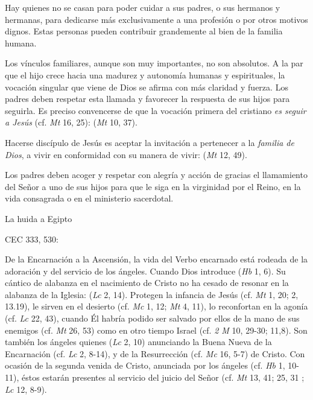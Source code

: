 	 Hay quienes no se casan para poder cuidar a sus padres, o sus hermanos y hermanas, para dedicarse más exclusivamente a una profesión o por otros motivos dignos. Estas personas pueden contribuir grandemente al bien de la familia humana.
	
	 Los vínculos familiares, aunque son muy importantes, no son absolutos. A la par que el hijo crece hacia una madurez y autonomía humanas y espirituales, la vocación singular que viene de Dios se afirma con más claridad y fuerza. Los padres deben respetar esta llamada y favorecer la respuesta de sus hijos para seguirla. Es preciso convencerse de que la vocación primera del cristiano \emph{es seguir a Jesús} (cf. \emph{Mt} 16, 25):  (\emph{Mt} 10, 37).
	
	 Hacerse discípulo de Jesús es aceptar la invitación a pertenecer a la \emph{familia de Dios}, a vivir en conformidad con su manera de vivir:  (\emph{Mt} 12, 49).
	
	Los padres deben acoger y respetar con alegría y acción de gracias el llamamiento del Señor a uno de sus hijos para que le siga en la virginidad por el Reino, en la vida consagrada o en el ministerio sacerdotal.
	
	La huida a Egipto
	
	CEC 333, 530:
	
	 De la Encarnación a la Ascensión, la vida del Verbo encarnado está rodeada de la adoración y del servicio de los ángeles. Cuando Dios introduce  (\emph{Hb} 1, 6). Su cántico de alabanza en el nacimiento de Cristo no ha cesado de resonar en la alabanza de la Iglesia:  (\emph{Lc} 2, 14). Protegen la infancia de Jesús (cf. \emph{Mt} 1, 20; 2, 13.19), le sirven en el desierto (cf. \emph{Mc} 1, 12; \emph{Mt} 4, 11), lo reconfortan en la agonía (cf. \emph{Lc} 22, 43), cuando Él habría podido ser salvado por ellos de la mano de sus enemigos (cf. \emph{Mt} 26, 53) como en otro tiempo Israel (cf. \emph{2 M} 10, 29-30; 11,8). Son también los ángeles quienes  (\emph{Lc} 2, 10) anunciando la Buena Nueva de la Encarnación (cf. \emph{Lc} 2, 8-14), y de la Resurrección (cf. \emph{Mc} 16, 5-7) de Cristo. Con ocasión de la segunda venida de Cristo, anunciada por los ángeles (cf. \emph{Hb} 1, 10-11), éstos estarán presentes al servicio del juicio del Señor (cf. \emph{Mt} 13, 41; 25, 31 ; \emph{Lc} 12, 8-9).
	
